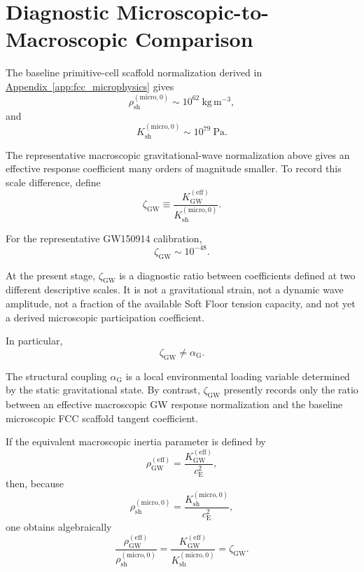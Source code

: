 \section{Diagnostic Microscopic-to-Macroscopic Comparison}

The baseline primitive-cell scaffold normalization derived in \hyperref[app:fcc_microphysics]{Appendix~\ref*{app:fcc_microphysics}} gives
\begin{equation}
    \rho_{\mathrm{sh}}^{(\mathrm{micro},0)} \sim 10^{62}\ \mathrm{kg\,m^{-3}},
\end{equation}
and
\begin{equation}
    K_{\mathrm{sh}}^{(\mathrm{micro},0)} \sim 10^{79}\ \mathrm{Pa}.
\end{equation}

The representative macroscopic gravitational-wave normalization above gives an effective response coefficient many orders of magnitude smaller. To record this scale difference, define
\begin{equation}
    \zeta_{\mathrm{GW}} \equiv \frac{ K_{\mathrm{GW}}^{(\mathrm{eff})} }{ K_{\mathrm{sh}}^{(\mathrm{micro},0)} }.
\end{equation}

For the representative GW150914 calibration,
\begin{equation}
    \zeta_{\mathrm{GW}} \sim 10^{-48}.
\end{equation}

At the present stage, $\zeta_{\mathrm{GW}}$ is a diagnostic ratio between coefficients defined at two different descriptive scales. It is not a gravitational strain, not a dynamic wave amplitude, not a fraction of the available Soft Floor tension capacity, and not yet a derived microscopic participation coefficient.

In particular,
\begin{equation}
    \zeta_{\mathrm{GW}} \neq \alpha_{\mathrm{G}}.
\end{equation}

The structural coupling $\alpha_{\mathrm{G}}$ is a local environmental loading variable determined by the static gravitational state. By contrast, $\zeta_{\mathrm{GW}}$ presently records only the ratio between an effective macroscopic GW response normalization and the baseline microscopic FCC scaffold tangent coefficient.

If the equivalent macroscopic inertia parameter is defined by
\begin{equation}
    \rho_{\mathrm{GW}}^{(\mathrm{eff})} = \frac{ K_{\mathrm{GW}}^{(\mathrm{eff})} }{ c_{\mathrm{E}}^2 },
\end{equation}
then, because
\begin{equation}
    \rho_{\mathrm{sh}}^{(\mathrm{micro},0)} = \frac{ K_{\mathrm{sh}}^{(\mathrm{micro},0)} }{ c_{\mathrm{E}}^2 },
\end{equation}
one obtains algebraically
\begin{equation}
    \frac{ \rho_{\mathrm{GW}}^{(\mathrm{eff})} }{ \rho_{\mathrm{sh}}^{(\mathrm{micro},0)} } = \frac{ K_{\mathrm{GW}}^{(\mathrm{eff})} }{ K_{\mathrm{sh}}^{(\mathrm{micro},0)} } = \zeta_{\mathrm{GW}}.
\end{equation}

